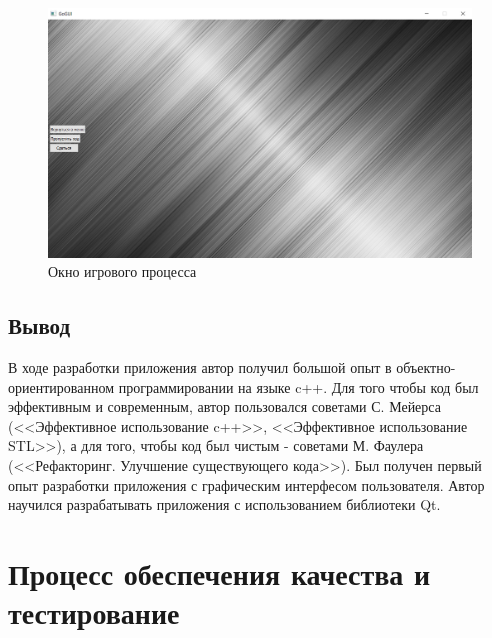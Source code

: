 \begin{figure}[H]
	\begin{center}
		\includegraphics[scale=0.5]{pics/GoGUI/Game.png}
	    \caption{Окно игрового процесса} 
		\label{pic:CUI_Game}
	\end{center}
\end{figure}

\subsection*{Вывод}

В ходе разработки приложения автор получил большой опыт в объектно-ориентированном программировании на языке c++. Для того чтобы код был эффективным и современным, автор пользовался советами С. Мейерса (<<Эффективное использование c++>>, <<Эффективное использование STL>>), а для того, чтобы код был чистым - советами М. Фаулера (<<Рефакторинг. Улучшение существующего кода>>). Был получен первый опыт разработки приложения с графическим интерфесом пользователя. Автор научился разрабатывать приложения с использованием библиотеки Qt.

\section*{Процесс обеспечения качества и тестирование}


